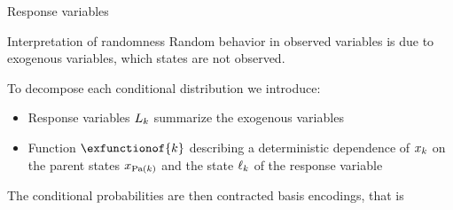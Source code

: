\documentclass{beamer}
\begin{document}
    \begin{frame}{Response variables}

        \begin{block}{Interpretation of randomness}
            Random behavior in observed variables is due to exogenous variables, which states are not observed.
        \end{block}

        To decompose each conditional distribution we introduce:
        \begin{itemize}
            \item Response variables $L_{k}$ summarize the exogenous variables
            \item Function $\exfunctionof{\catenumerator}$ describing a deterministic dependence of $x_{k}$ on the parent states $x_{\mathrm{Pa}(k)}$ and the state $\ell_{k}$ of the response variable
        \end{itemize}
        The conditional probabilities are then contracted basis encodings, that is
    \end{frame}
\end{document}
